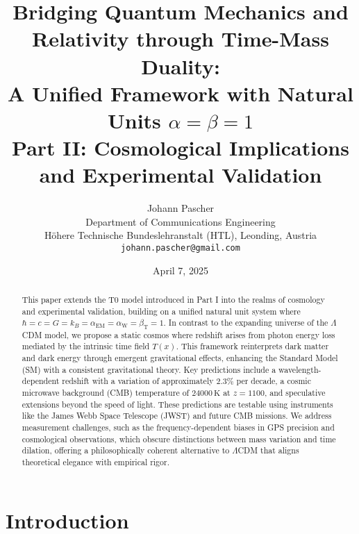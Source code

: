 \documentclass[12pt,a4paper]{article}
\title{Bridging Quantum Mechanics and Relativity through Time-Mass Duality: \\ A Unified Framework with Natural Units \(\alpha = \beta = 1\) \\ Part II: Cosmological Implications and Experimental Validation}
\author{Johann Pascher\\
	Department of Communications Engineering\\
	Höhere Technische Bundeslehranstalt (HTL), Leonding, Austria\\
	\texttt{johann.pascher@gmail.com}}
\date{April 7, 2025}
\newcommand{\Tfield}{T(x)}
\newcommand{\alphaEM}{\alpha_{\text{EM}}}
\newcommand{\alphaW}{\alpha_{\text{W}}}
\newcommand{\betaT}{\beta_{\text{T}}}
\begin{document}
	
	\maketitle
	
	\begin{abstract}
		This paper extends the T0 model introduced in Part I into the realms of cosmology and experimental validation, building on a unified natural unit system where \(\hbar = c = G = k_B = \alphaEM = \alphaW = \betaT = 1\). In contrast to the expanding universe of the \(\Lambda\)CDM model, we propose a static cosmos where redshift arises from photon energy loss mediated by the intrinsic time field \(\Tfield\). This framework reinterprets dark matter and dark energy through emergent gravitational effects, enhancing the Standard Model (SM) with a consistent gravitational theory. Key predictions include a wavelength-dependent redshift with a variation of approximately \(2.3\%\) per decade, a cosmic microwave background (CMB) temperature of \(24000 \, \text{K}\) at \(z = 1100\), and speculative extensions beyond the speed of light. These predictions are testable using instruments like the James Webb Space Telescope (JWST) and future CMB missions. We address measurement challenges, such as the frequency-dependent biases in GPS precision and cosmological observations, which obscure distinctions between mass variation and time dilation, offering a philosophically coherent alternative to \(\Lambda\)CDM that aligns theoretical elegance with empirical rigor.
	\end{abstract}
	
	\section{Introduction}
	\label{sec:introduction}
	
\end{document}
